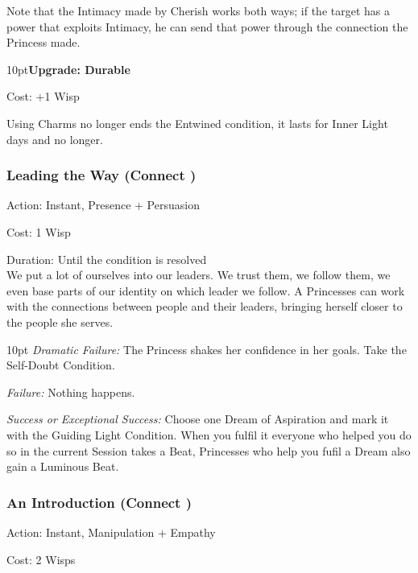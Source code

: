 \noindent Note that the Intimacy made by Cherish works both ways; if the target has a power that exploits Intimacy, he can send that power through the connection the Princess made.

\begin{myindentpar}{10pt}\textbf{Upgrade: Durable}

\noindent Cost: +1 Wisp

\noindent Using Charms no longer ends the Entwined condition, it lasts for Inner Light days and no longer. \end{myindentpar}

\subsubsection*{Leading the Way (Connect \textbullet\textbullet\textbullet)}

\noindent Action: Instant, Presence + Persuasion

\noindent Cost: 1 Wisp

\noindent Duration: Until the condition is resolved \\

\noindent We put a lot of ourselves into our leaders. We trust them, we follow them, we even base parts of our identity on which leader we follow. A Princesses can work with the connections between people and their leaders, bringing herself closer to the people she serves. 

\begin{myindentpar}{10pt}
    \emph{Dramatic Failure:} The Princess shakes her confidence in her goals. Take the Self-Doubt Condition. 
    
    \emph{Failure:} Nothing happens. 
    
    \emph{Success or Exceptional Success:} Choose one Dream of Aspiration and mark it with the Guiding Light Condition. When you fulfil it everyone who helped you do so in the current Session takes a Beat, Princesses who help you fufil a Dream also gain a Luminous Beat. 
    
\end{myindentpar}

\subsubsection*{An Introduction (Connect \textbullet\textbullet\textbullet)}

\noindent Action: Instant, Manipulation + Empathy

\noindent Cost: 2 Wisps

